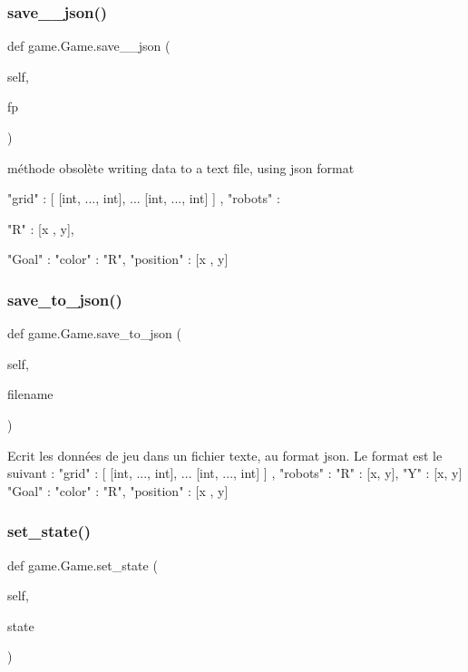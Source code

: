 \subsubsection{\texorpdfstring{save\+\_\+\_\+json()}{save\_2\_json()}}
{\footnotesize\ttfamily def game.\+Game.\+save\+\_\+\_\+json (\begin{DoxyParamCaption}\item[{}]{self,  }\item[{}]{fp }\end{DoxyParamCaption})}

\begin{DoxyVerb}méthode obsolète
writing data to a text file, using json format

{
"grid" : [ [int, ..., int],
            ...
    [int, ..., int]
    ] ,
"robots" :  {
    "R" : [x , y],

    }
"Goal" : {
    "color" : "R",
    "position" : [x , y]
    }
}
\end{DoxyVerb}
 \mbox{\label{classgame_1_1Game_a7c525e5a47b01fb5bed17fe1438c13f5}} 
\subsubsection{\texorpdfstring{save\+\_\+to\+\_\+json()}{save\_to\_json()}}
{\footnotesize\ttfamily def game.\+Game.\+save\+\_\+to\+\_\+json (\begin{DoxyParamCaption}\item[{}]{self,  }\item[{}]{filename }\end{DoxyParamCaption})}

\begin{DoxyVerb}Ecrit les données de jeu dans un fichier texte, au format json.
Le format est le suivant :
{
"grid" : [ [int, ..., int],
            ...
    [int, ..., int]
    ] ,
"robots" :  {
    "R" : [x, y],
    "Y" : [x, y]
    }
"Goal" : {
    "color" : "R",
    "position" : [x , y]
    }
}
\end{DoxyVerb}
 \mbox{\label{classgame_1_1Game_a7e87798fb7f81b80c11fcaec17860577}} 
\subsubsection{\texorpdfstring{set\+\_\+state()}{set\_state()}}
{\footnotesize\ttfamily def game.\+Game.\+set\+\_\+state (\begin{DoxyParamCaption}\item[{}]{self,  }\item[{}]{state }\end{DoxyParamCaption})}

